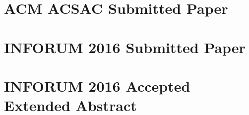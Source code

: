 
\chapter{ACM ACSAC Submitted Paper}
\label{appendix:appendix_chapter}



\chapter{INFORUM 2016 Submitted Paper}
\label{appendix:appendix_chapter}



\chapter{INFORUM 2016 Accepted Extended Abstract}
\label{appendix:appendix_chapter}



